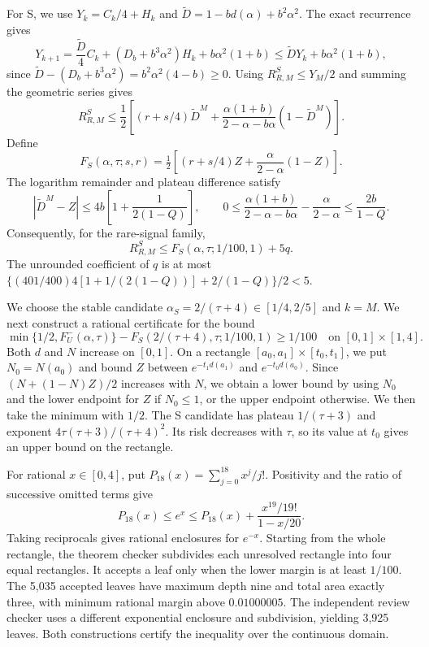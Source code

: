 For S, we use $Y_k=C_k/4+H_k$ and
$\widetilde D=1-bd(\alpha)+b^2\alpha^2$. The exact recurrence gives
\[
 Y_{k+1}=\frac{\widetilde D}{4}C_k+
          (D_b+b^3\alpha^2)H_k+b\alpha^2(1+b)
 \leq\widetilde D Y_k+b\alpha^2(1+b),
\]
since $\widetilde D-(D_b+b^3\alpha^2)=b^2\alpha^2(4-b)\geq0$.
Using $R_{R,M}^S\leq Y_M/2$ and summing the geometric series gives
\[
 R_{R,M}^S\leq\frac12\left[(r+s/4)\widetilde D^M+
       \frac{\alpha(1+b)}{2-\alpha-b\alpha}(1-\widetilde D^M)\right].
\]
Define
\[
 F_S(\alpha,\tau;s,r)=\tfrac12\left[(r+s/4)Z+
                    \frac{\alpha}{2-\alpha}(1-Z)\right].
\]
The logarithm remainder and plateau difference satisfy
\[
 |\widetilde D^M-Z|\leq4b\left[1+\frac1{2(1-Q)}\right],\qquad
 0\leq\frac{\alpha(1+b)}{2-\alpha-b\alpha}
       -\frac{\alpha}{2-\alpha}\leq\frac{2b}{1-Q}.
\]
Consequently, for the rare-signal family,
\begin{equation}
 R_{R,M}^S\leq F_S(\alpha,\tau;1/100,1)+5q.
 \label{eq:predictive-s-transfer}
\end{equation}
The unrounded coefficient of $q$ is at most
$\{(401/400)4[1+1/(2(1-Q))]+2/(1-Q)\}/2<5$.

We choose the stable candidate $\alpha_S=2/(\tau+4)\in[1/4,2/5]$ and $k=M$.
We next construct a rational certificate for the bound
\begin{equation}
 \min\{1/2,F_U^-(\alpha,\tau)\}
 -F_S(2/(\tau+4),\tau;1/100,1)\geq1/100
 \quad\text{on }[0,1]\times[1,4].
 \label{eq:predictive-certificate}
\end{equation}
Both $d$ and $N$ increase on $[0,1]$. On a rectangle
$[a_0,a_1]\times[t_0,t_1]$, we put $N_0=N(a_0)$ and bound $Z$ between
$e^{-t_1d(a_1)}$ and $e^{-t_0d(a_0)}$. Since $(N+(1-N)Z)/2$ increases with
$N$, we obtain a lower bound by using $N_0$ and the lower endpoint for $Z$ if
$N_0\leq1$, or the upper endpoint otherwise. We then take the minimum with
$1/2$. The S candidate has plateau $1/(\tau+3)$ and exponent
$4\tau(\tau+3)/(\tau+4)^2$. Its risk decreases with $\tau$, so its value at
$t_0$ gives an upper bound on the rectangle.

For rational $x\in[0,4]$, put $P_{18}(x)=\sum_{j=0}^{18}x^j/j!$. Positivity
and the ratio of successive omitted terms give
\begin{equation}
 P_{18}(x)\leq e^x\leq P_{18}(x)+\frac{x^{19}/19!}{1-x/20}.
 \label{eq:predictive-exp-certificate}
\end{equation}
Taking reciprocals gives rational enclosures for $e^{-x}$. Starting from the
whole rectangle, the theorem checker subdivides each unresolved rectangle into
four equal rectangles. It accepts a leaf only when the lower margin is at least
$1/100$. The 5,035 accepted leaves have maximum depth nine and total area
exactly three, with minimum rational margin above $0.01000005$. The independent
review checker uses a different exponential enclosure and subdivision, yielding
3,925 leaves. Both constructions certify the inequality over the continuous
domain.

